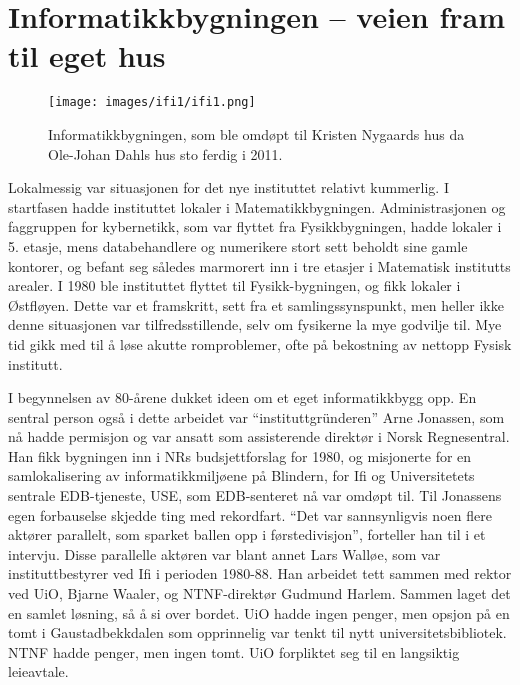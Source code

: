 \chapter[Ifi 1]{Informatikkbygningen – veien fram til eget hus}

\label{chap:ifi1}

\author{Skrevet av Narve Trædal}

\begin{figure}
	\texttt{[image: images/ifi1/ifi1.png]}
	\caption{Informatikkbygningen, som ble omdøpt til Kristen Nygaards hus da Ole-Johan Dahls hus sto ferdig i 2011.}
\end{figure}

Lokalmessig var situasjonen for det nye instituttet relativt kummerlig. I startfasen hadde instituttet lokaler i Matematikkbygningen. Administrasjonen og faggruppen for kybernetikk, som var flyttet fra Fysikkbygningen, hadde lokaler i 5. etasje, mens databehandlere og numerikere stort sett beholdt sine gamle kontorer, og befant seg således marmorert inn i tre etasjer i Matematisk institutts arealer. I 1980 ble instituttet flyttet til Fysikk-bygningen, og fikk lokaler i Østfløyen. Dette var et framskritt, sett fra et samlingssynspunkt, men heller ikke denne situasjonen var tilfredsstillende, selv om fysikerne la mye godvilje til. Mye tid gikk med til å løse akutte romproblemer, ofte på bekostning av nettopp Fysisk institutt.

I begynnelsen av 80-årene dukket ideen om et eget informatikkbygg opp. En sentral person også i dette arbeidet var ``instituttgründeren'' Arne Jonassen, som nå hadde permisjon og var ansatt som assisterende direktør i Norsk Regnesentral. Han fikk bygningen inn i NRs budsjettforslag for 1980, og misjonerte for en samlokalisering av informatikkmiljøene på Blindern, for Ifi og Universitetets sentrale EDB-tjeneste, USE, som EDB-senteret nå var omdøpt til. Til Jonassens egen forbauselse skjedde ting med rekordfart. ``Det var sannsynligvis noen flere aktører parallelt, som sparket ballen opp i førstedivisjon'', forteller han til i et intervju. Disse parallelle aktøren var blant annet Lars Walløe, som var instituttbestyrer ved Ifi i perioden 1980-88. Han arbeidet tett sammen med rektor ved UiO, Bjarne Waaler, og NTNF-direktør Gudmund Harlem. Sammen laget det en samlet løsning, så å si over bordet. UiO hadde ingen penger, men opsjon på en tomt i Gaustadbekkdalen som opprinnelig var tenkt til nytt universitetsbibliotek. NTNF hadde penger, men ingen tomt. UiO forpliktet seg til en langsiktig leieavtale.

